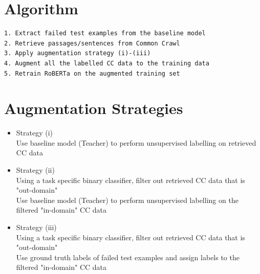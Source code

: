 \documentclass[11pt]{article}
\begin{document}
\section{Algorithm}
\label{sec:org61d6823}
\begin{verbatim}
1. Extract failed test examples from the baseline model
2. Retrieve passages/sentences from Common Crawl 
3. Apply augmentation strategy (i)-(iii)
4. Augment all the labelled CC data to the training data
5. Retrain RoBERTa on the augmented training set 
\end{verbatim}

\section{Augmentation Strategies}
\label{sec:orgad6602c}
\begin{itemize}
\item Strategy (i)\\
Use baseline model (Teacher) to perform unsupervised labelling on retrieved CC data
\item Strategy (ii)\\
Using a task specific binary classifier, 
filter out retrieved CC data that is "out-domain"\\
Use baseline model (Teacher) to perform unsupervised labelling on the filtered "in-domain" CC data
\item Strategy (iii)\\
Using a task specific binary classifier, 
filter out retrieved CC data that is "out-domain"\\
Use ground truth labels of failed test examples and assign labels to the filtered "in-domain" CC data
\end{itemize}
\end{document}
